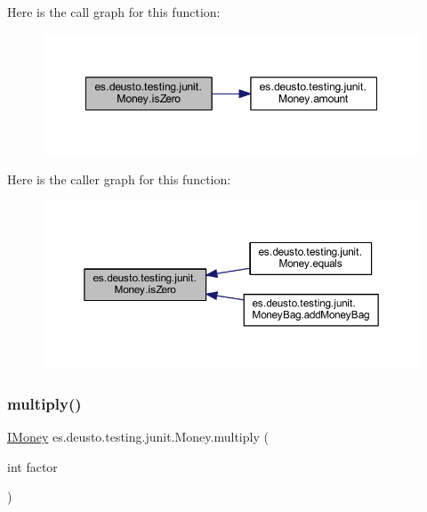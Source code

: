 Here is the call graph for this function\+:
\nopagebreak
\begin{figure}[H]
\begin{center}
\leavevmode
\includegraphics[width=348pt]{classes_1_1deusto_1_1testing_1_1junit_1_1_money_a797658a03260b535e9a36ebbcc3b19c9_cgraph}
\end{center}
\end{figure}
Here is the caller graph for this function\+:
\nopagebreak
\begin{figure}[H]
\begin{center}
\leavevmode
\includegraphics[width=350pt]{classes_1_1deusto_1_1testing_1_1junit_1_1_money_a797658a03260b535e9a36ebbcc3b19c9_icgraph}
\end{center}
\end{figure}
\mbox{\label{classes_1_1deusto_1_1testing_1_1junit_1_1_money_a02c7d4e9013710f70d1d46e9c9ebae88}} 
\subsubsection{\texorpdfstring{multiply()}{multiply()}}
{\footnotesize\ttfamily \hyperlink{interfacees_1_1deusto_1_1testing_1_1junit_1_1_i_money}{I\+Money} es.\+deusto.\+testing.\+junit.\+Money.\+multiply (\begin{DoxyParamCaption}\item[{int}]{factor }\end{DoxyParamCaption})}

